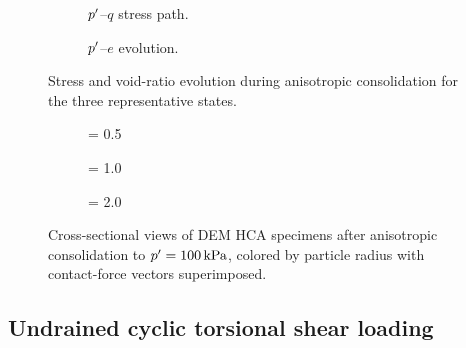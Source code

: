 \begin{figure}[t]
  \centering
  \begin{subfigure}[t]{\linewidth}
    \centering
    \caption{$p^\prime$--$q$ stress path.}
    \label{fig:ac_path_a}
  \end{subfigure}
  \vspace{6pt}
  \begin{subfigure}[t]{\linewidth}
    \centering
    \caption{$p^\prime$--$e$ evolution.}
    \label{fig:ac_path_b}
  \end{subfigure}
  \caption{Stress and void-ratio evolution during anisotropic consolidation for the three representative \Kzero{} states.}
  \label{fig:ac_path}
\end{figure}

\begin{figure}[t]
  \centering
  \begin{subfigure}[t]{\linewidth}
    \centering
    \caption{\Kzero{} = 0.5}
    \label{fig:ac_specimens_a}
  \end{subfigure}
  \vspace{6pt}
  \begin{subfigure}[t]{\linewidth}
    \centering
    \caption{\Kzero{} = 1.0}
    \label{fig:ac_specimens_b}
  \end{subfigure}
  \vspace{6pt}
  \begin{subfigure}[t]{\linewidth}
    \centering
    \caption{\Kzero{} = 2.0}
    \label{fig:ac_specimens_c}
  \end{subfigure}
  \caption{Cross-sectional views of DEM HCA specimens after anisotropic consolidation to $p^\prime=\SI{100}{kPa}$, colored by particle radius with contact-force vectors superimposed.}
  \label{fig:ac_specimens}
\end{figure}

\subsection{Undrained cyclic torsional shear loading}
\label{subsec:cyclic_loading}

